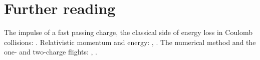 \documentclass{leveldoc}
\begin{document}
\section{Further reading}\label{sec:reading}

The impulse of a fast passing charge, the classical side of energy loss in Coulomb
collisions: . Relativistic momentum and energy: ,
. The
numerical method and the one- and two-charge flights: ,
.

\levelfileappendix
\end{document}
